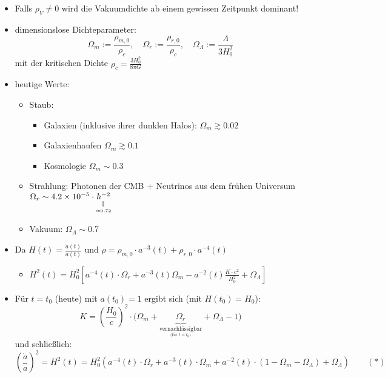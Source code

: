 \begin{itemize}
	\item Falls $\rho_V\neq 0$ wird die Vakuumdichte ab einem gewissen Zeitpunkt dominant!
	\item dimensionslose Dichteparameter:
		\begin{equation*}
			\Omega_m :=\frac{\rho_{m,0}}{\rho_c},\quad\Omega_r :=\frac{\rho_{r,0}}{\rho_c},\quad\Omega_\Lambda :=\frac{\Lambda}{3H_0^2}
		\end{equation*}
		mit der kritischen Dichte $\rho_c=\frac{3H_0^2}{8\pi G}$
	\item heutige Werte:
		\begin{itemize}[label={}]
			\item Staub:
				\begin{itemize}[label={}]
					\item Galaxien (inklusive ihrer dunklen Halos): $\Omega_m\gtrsim\num{0.02}$
					\item Galaxienhaufen $\Omega_m\gtrsim\num{0.1}$
					\item Kosmologie $\Omega_m\sim\num{0.3}$
				\end{itemize}
			\item Strahlung: Photonen der CMB + Neutrinos aus dem frühen Universum $\Omega_r\sim\num{4.2e-5}\cdot \underset{\underset{\approx\num{0.72}}{\rotatebox{90}{=}}}{h^{-2}}$
			\item Vakuum: $\Omega_\Lambda\sim\num{0.7}$
		\end{itemize}
	\item Da $H(t)=\frac{\dot{a}(t)}{a(t)}$ und $\rho=\rho_{m,0}\cdot a^{-3}(t)+\rho_{r,0}\cdot a^{-4}(t)$
		\begin{itemize}
			\item $H^2(t)=H_0^2\left[a^{-4}(t)\cdot\Omega_r+a^{-3}(t)\Omega_m-a^{-2}(t)\frac{K\cdot c^2}{H_0^2}+\Omega_\Lambda\right]$
		\end{itemize}
	\item Für $t=t_0$ (heute) mit $a(t_0)=1$ ergibt sich (mit $H(t_0)=H_0$):
		\begin{equation*}
			K=\left(\frac{H_0}{c}\right)^2\cdot\big(\Omega_m+\underset{\underset{\text{(für $t=t_0$)}}{\text{vernachlässigbar}}}{\underbrace{\Omega_r}}+\Omega_\Lambda -1\big)
		\end{equation*}
		und schließlich:
		\begin{equation*}
			\left(\frac{\dot{a}}{a}\right)^2=H^2(t)=H_0^2\left(a^{-4}(t)\cdot\Omega_r+a^{-3}(t)\cdot\Omega_m+a^{-2}(t)\cdot (1-\Omega_m-\Omega_\Lambda)+\Omega_\Lambda\right)\qquad (\ast)

\end{equation*}
\end{itemize}
